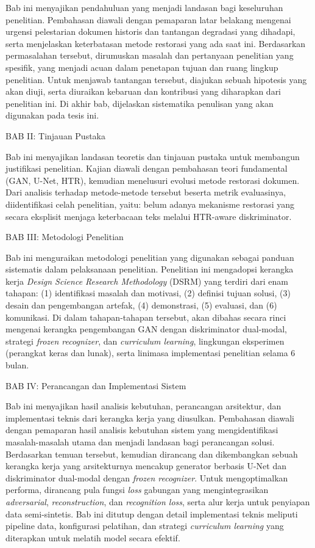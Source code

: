 Bab ini menyajikan pendahuluan  yang menjadi landasan bagi keseluruhan penelitian. Pembahasan diawali dengan pemaparan latar belakang mengenai urgensi pelestarian dokumen historis dan tantangan degradasi yang dihadapi, serta menjelaskan keterbatasan metode restorasi yang ada saat ini. Berdasarkan permasalahan tersebut, dirumuskan masalah dan pertanyaan penelitian yang spesifik, yang menjadi acuan dalam penetapan tujuan dan ruang lingkup penelitian. Untuk menjawab tantangan tersebut, diajukan sebuah hipotesis yang akan diuji, serta diuraikan kebaruan dan kontribusi yang diharapkan dari penelitian ini. Di akhir bab, dijelaskan sistematika penulisan yang akan digunakan pada tesis ini.

\vspace{0.5em}
BAB II: Tinjauan Pustaka

Bab ini menyajikan landasan teoretis dan tinjauan pustaka untuk membangun justifikasi penelitian. Kajian diawali dengan pembahasan teori fundamental (GAN, U-Net, HTR), kemudian menelusuri evolusi metode restorasi dokumen. Dari analisis  terhadap metode-metode tersebut beserta metrik evaluasinya, diidentifikasi celah penelitian, yaitu: belum adanya mekanisme restorasi yang secara eksplisit menjaga keterbacaan teks melalui HTR-aware diskriminator.

\vspace{0.5em}
BAB III: Metodologi Penelitian

Bab ini menguraikan metodologi penelitian yang digunakan sebagai panduan sistematis dalam pelaksanaan penelitian. Penelitian ini mengadopsi kerangka kerja \textit{Design Science Research Methodology} (DSRM) yang terdiri dari enam tahapan: (1) identifikasi masalah dan motivasi, (2) definisi tujuan solusi, (3) desain dan pengembangan artefak, (4) demonstrasi, (5) evaluasi, dan (6) komunikasi. Di dalam tahapan-tahapan tersebut, akan dibahas secara rinci mengenai kerangka pengembangan GAN dengan diskriminator dual-modal, strategi \textit{frozen recognizer}, dan \textit{curriculum learning}, lingkungan eksperimen (perangkat keras dan lunak), serta linimasa implementasi penelitian selama 6 bulan.

\vspace{0.5em}
BAB IV: Perancangan dan Implementasi Sistem

Bab ini menyajikan hasil analisis kebutuhan, perancangan arsitektur, dan implementasi teknis dari kerangka kerja yang diusulkan. Pembahasan diawali dengan pemaparan hasil analisis kebutuhan sistem yang mengidentifikasi masalah-masalah utama dan menjadi landasan bagi perancangan solusi. Berdasarkan temuan tersebut, kemudian dirancang dan dikembangkan sebuah kerangka kerja yang arsitekturnya mencakup generator berbasis U-Net dan diskriminator dual-modal dengan \textit{frozen recognizer}. Untuk mengoptimalkan performa, dirancang pula fungsi \textit{loss} gabungan yang mengintegrasikan \textit{adversarial}, \textit{reconstruction}, dan \textit{recognition loss}, serta alur kerja untuk penyiapan data semi-sintetis. Bab ini ditutup dengan detail implementasi teknis meliputi pipeline data, konfigurasi pelatihan, dan strategi \textit{curriculum learning} yang diterapkan untuk melatih model secara efektif.

